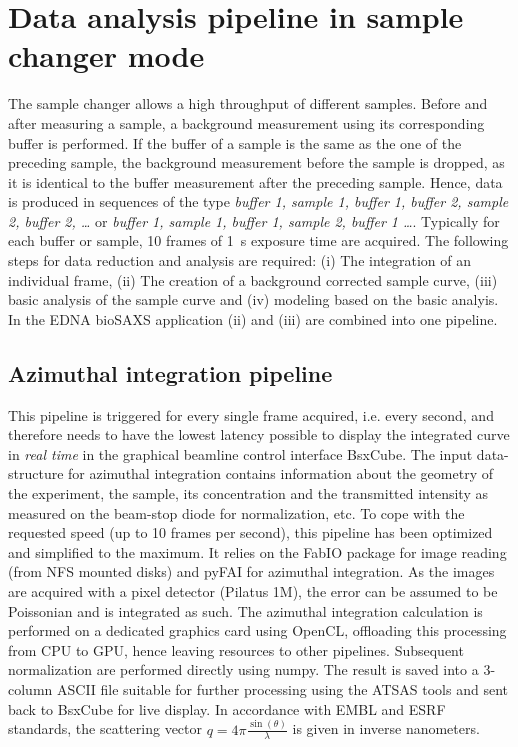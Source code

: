 \documentclass[preprint,pdf]{iucr}              %
\begin{document}
\section{Data analysis pipeline in sample changer mode}

The sample changer allows a high throughput of different samples. Before and after measuring a sample, a background measurement using its corresponding buffer is performed. If the buffer of a sample is the same as the one of the preceding sample, the background measurement before the sample is dropped, as it is identical to the buffer measurement after the preceding sample. Hence, data is produced in sequences of the type \textit{buffer 1, sample 1, buffer 1, buffer 2, sample 2, buffer 2, \ldots} or  \textit{buffer 1, sample 1, buffer 1,  sample 2, buffer 1 \ldots}. Typically for each buffer or sample, 10 frames of 1~s exposure time are acquired. The following steps for data reduction and analysis are required:
(i) The integration of an individual frame, (ii) The creation of a background corrected sample curve, (iii) basic analysis of the sample curve and (iv) modeling based on the basic analyis. In the EDNA bioSAXS application (ii) and (iii) are combined into one pipeline.

\subsection{Azimuthal integration pipeline}

This pipeline is triggered for every single frame acquired, i.e. every second,
and therefore needs to have the lowest latency possible to display the integrated curve
in \textit{real time} in the graphical beamline control  interface BsxCube.
The input data-structure for azimuthal integration contains
information about the geometry of the experiment, the sample, its concentration
and the transmitted intensity as measured on the beam-stop diode for
normalization, etc.
To cope with the requested speed (up to 10 frames per second), this pipeline
has been optimized and simplified to the maximum.
It relies on the FabIO\cite{fabio} package for image reading (from NFS mounted disks) and
pyFAI\cite{pyFAI} for azimuthal integration.
As the images are acquired with a pixel detector (Pilatus 1M), the error can be
assumed to be Poissonian and is integrated as such.
The azimuthal integration calculation is performed on a dedicated graphics card using OpenCL, offloading this processing from CPU to
GPU, hence leaving resources to other pipelines.
Subsequent normalization are performed directly using numpy\cite{numpy}.
The result is saved into a 3-column ASCII file suitable for further processing
using the ATSAS tools\cite{atsas} and sent back to BsxCube for live display.
In accordance with EMBL and ESRF standards, the scattering vector $q=4\pi\frac{\sin(\theta)}{\lambda}$ is given in inverse nanometers.
\end{document}
